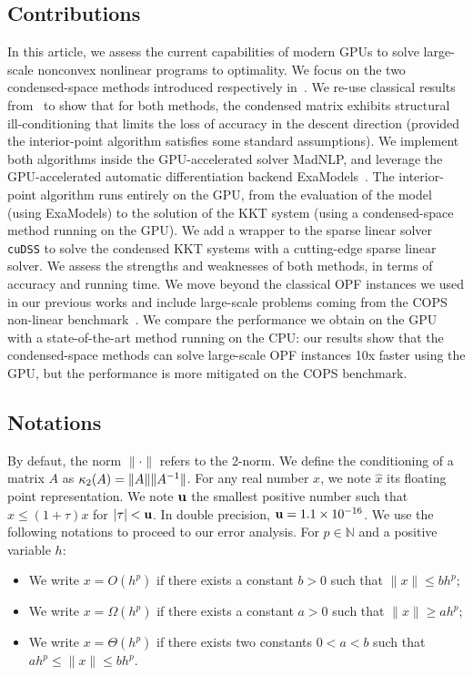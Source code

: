 \subsection{Contributions}
In this article, we assess the current capabilities of modern GPUs
to solve large-scale nonconvex nonlinear programs to optimality.
We focus on the two condensed-space methods
introduced respectively in~\cite{regev2023hykkt,shin2023accelerating}.
We re-use classical results from~\cite{wright1998ill} to show
that for both methods, the condensed matrix exhibits
structural ill-conditioning that limits the loss of accuracy in
the descent direction (provided the interior-point algorithm satisfies
some standard assumptions).
We implement both algorithms inside the GPU-accelerated solver MadNLP,
and leverage the GPU-accelerated automatic differentiation
backend ExaModels~\cite{shin2023accelerating}.
The interior-point algorithm runs entirely on the GPU, from
the evaluation of the model (using ExaModels) to the solution of
the KKT system (using a condensed-space method running on the GPU).
We add a wrapper to the sparse linear solver {\tt cuDSS} to solve
the condensed KKT systems with a cutting-edge sparse linear solver.
We assess the strengths
and weaknesses of both methods, in terms of accuracy and running time.
We move beyond the classical OPF instances we used in our previous works
and include large-scale problems coming from the COPS
non-linear benchmark~\cite{dolan2004benchmarking}.
We compare the performance we obtain on the GPU with a state-of-the-art
method running on the CPU: our results show that the condensed-space
methods can solve large-scale OPF instances 10x faster using the GPU,
but the performance is more mitigated on the COPS benchmark.

\subsection{Notations}
By defaut, the norm $\|\cdot\|$ refers to the 2-norm.
We define the conditioning of a matrix $A$ as
$\kappa_2(A) = \| A \| \|A^{-1} \|$.
For any real number $x$, we note $\widehat{x}$ its floating
point representation.
We note $\mathbf{u}$ the smallest positive number such that
$\widehat{x} \leq (1 + \tau) x$ for $|\tau| < \mathbf{u}$.
In double precision, $\mathbf{u} = 1.1 \times 10^{-16}$.
We use the following notations to proceed to our error analysis.
For $p \in \mathbb{N}$ and a positive variable $h$:
\begin{itemize}
  \item We write $x = O(h^p)$ if there exists a constant $b > 0$
    such that $\| x \| \leq b h^p$;
  \item We write $x = \Omega(h^p)$ if there exists a constant $a > 0$
    such that $\| x \| \geq a h^p$;
  \item We write $x = \Theta(h^p)$ if there exists two constants $0 < a < b$
    such that $a h^p \leq \| x \| \leq b h^p$.
\end{itemize}

